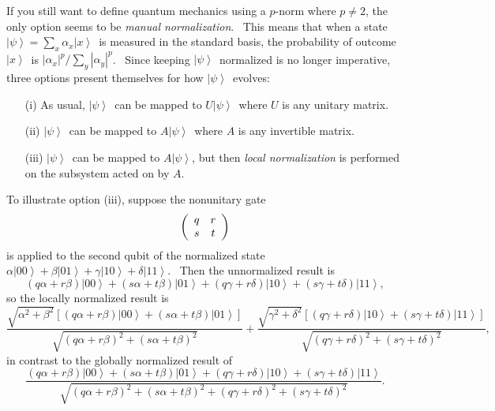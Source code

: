\documentclass[12pt]{article}%
\begin{document}
If you still want to define quantum mechanics using a $p$-norm where $p\neq2$,
the only option seems to be \textit{manual normalization}. \ This means that
when a state $\left\vert \psi\right\rangle =\sum_{x}\alpha_{x}\left\vert
x\right\rangle $\ is measured in the standard basis, the probability of
outcome $\left\vert x\right\rangle $\ is $\left\vert \alpha_{x}\right\vert
^{p}/\sum_{y}\left\vert \alpha_{y}\right\vert ^{p}$. \ Since keeping
$\left\vert \psi\right\rangle $\ normalized is no longer imperative, three
options present themselves for how $\left\vert \psi\right\rangle $\ evolves:

\begin{enumerate}
\item[(i)] As usual, $\left\vert \psi\right\rangle $\ can be mapped to
$U\left\vert \psi\right\rangle $\ where $U$ is any unitary matrix.

\item[(ii)] $\left\vert \psi\right\rangle $\ can be mapped to $A\left\vert
\psi\right\rangle $\ where $A$ is any invertible matrix.

\item[(iii)] $\left\vert \psi\right\rangle $\ can be mapped to $A\left\vert
\psi\right\rangle $, but then \textit{local normalization} is performed on the
subsystem acted on by $A$.
\end{enumerate}

To illustrate option (iii), suppose the nonunitary gate%
\[
\left(
\begin{array}
[c]{cc}%
q & r\\
s & t
\end{array}
\right)
\]
is applied to the second qubit of the normalized state $\alpha\left|
00\right\rangle +\beta\left|  01\right\rangle +\gamma\left|  10\right\rangle
+\delta\left|  11\right\rangle $. \ Then the unnormalized result is%
\[
\left(  q\alpha+r\beta\right)  \left|  00\right\rangle +\left(  s\alpha
+t\beta\right)  \left|  01\right\rangle +\left(  q\gamma+r\delta\right)
\left|  10\right\rangle +\left(  s\gamma+t\delta\right)  \left|
11\right\rangle ,
\]
so the locally normalized result is%
\[
\frac{\sqrt{\alpha^{2}+\beta^{2}}\left[  \left(  q\alpha+r\beta\right)
\left|  00\right\rangle +\left(  s\alpha+t\beta\right)  \left|
01\right\rangle \right]  }{\sqrt{\left(  q\alpha+r\beta\right)  ^{2}+\left(
s\alpha+t\beta\right)  ^{2}}}+\frac{\sqrt{\gamma^{2}+\delta^{2}}\left[
\left(  q\gamma+r\delta\right)  \left|  10\right\rangle +\left(
s\gamma+t\delta\right)  \left|  11\right\rangle \right]  }{\sqrt{\left(
q\gamma+r\delta\right)  ^{2}+\left(  s\gamma+t\delta\right)  ^{2}}},
\]
in contrast to the globally normalized result of%
\[
\frac{\left(  q\alpha+r\beta\right)  \left|  00\right\rangle +\left(
s\alpha+t\beta\right)  \left|  01\right\rangle +\left(  q\gamma+r\delta
\right)  \left|  10\right\rangle +\left(  s\gamma+t\delta\right)  \left|
11\right\rangle }{\sqrt{\left(  q\alpha+r\beta\right)  ^{2}+\left(
s\alpha+t\beta\right)  ^{2}+\left(  q\gamma+r\delta\right)  ^{2}+\left(
s\gamma+t\delta\right)  ^{2}}}.
\]
\end{document}
